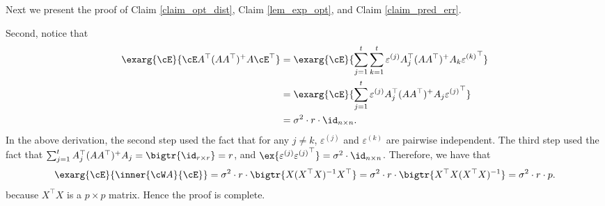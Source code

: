 \documentclass[aos,preprint]{imsart}
\begin{document}
	\iffalse	
Next we present the proof of Claim \ref{claim_opt_dist}, Claim \ref{lem_exp_opt}, and Claim \ref{claim_pred_err}. 
	
	

	Second, notice that
	\begin{align*}
			\exarg{\cE}{\cE A^{\top} (AA^{\top})^{+} A \cE^{\top}}
		&= \exarg{\cE}{\sum_{j=1}^t \sum_{k=1}^t \varepsilon^{(j)} A_j^{\top} (AA^{\top})^{+} A_k {\varepsilon^{(k)}}^{\top}} \\
		&= \exarg{\cE}{\sum_{j=1}^t \varepsilon^{(j)} A_j^{\top} (AA^{\top})^{+} A_j {\varepsilon^{(j)}}^{\top}} \\
		&= \sigma^2 \cdot r \cdot \id_{n\times n}.
	\end{align*}
	In the above derivation, the second step used the fact that for any $j\neq k$, $\varepsilon^{(j)}$ and $\varepsilon^{(k)}$ are pairwise independent.
	The third step used the fact that $\sum_{j=1}^t A_j^{\top} (AA^{\top})^{+} A_j = \bigtr{\id_{r\times r}} = r$, and $\ex{\varepsilon^{(j)} {\varepsilon^{(j)}}^{\top}} = \sigma^2 \cdot \id_{n\times n}$.
	Therefore, we have that
	\begin{align*}
		\exarg{\cE}{ \inner{\cW A}{\cE}} = \sigma^2 \cdot r \cdot \bigtr{X(X^{\top} X)^{-1} X^{\top}} =  \sigma^2 \cdot r \cdot \bigtr{ X^{\top}X(X^{\top} X)^{-1}}  = \sigma^2 \cdot r \cdot p.
	\end{align*}
   because $X^\top X$ is a $p\times p$ matrix.	
	Hence the proof is complete.
\end{document}
